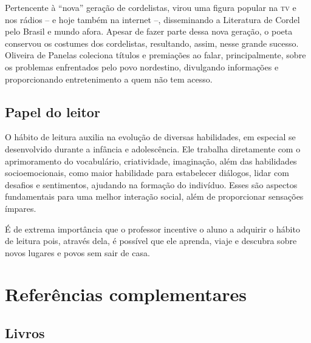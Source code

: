 \documentclass[12pt]{extarticle}
\begin{document}
Pertencente à ``nova'' geração de cordelistas, virou uma figura popular
na \textsc{tv} e nos rádios -- e hoje também na internet --, disseminando a
Literatura de Cordel pelo Brasil e mundo afora. Apesar de fazer parte
dessa nova geração, o poeta conservou os costumes dos cordelistas,
resultando, assim, nesse grande sucesso. Oliveira de Panelas coleciona
títulos e premiações ao falar, principalmente, sobre os problemas
enfrentados pelo povo nordestino, divulgando informações e
proporcionando entretenimento a quem não tem acesso.

\subsection{Papel do leitor}

O hábito de leitura auxilia na evolução de diversas habilidades, em
especial se desenvolvido durante a infância e adolescência. Ele trabalha
diretamente com o aprimoramento do vocabulário, criatividade,
imaginação, além das habilidades socioemocionais, como maior habilidade
para estabelecer diálogos, lidar com desafios e sentimentos, ajudando na
formação do indivíduo. Esses são aspectos fundamentais para uma melhor
interação social, além de proporcionar sensações ímpares.

É de extrema importância que o professor incentive o aluno a adquirir o
hábito de leitura pois, através dela, é possível que ele aprenda, viaje
e descubra sobre novos lugares e povos sem sair de casa.

\section{Referências complementares}

\subsection{Livros}
\end{document}
